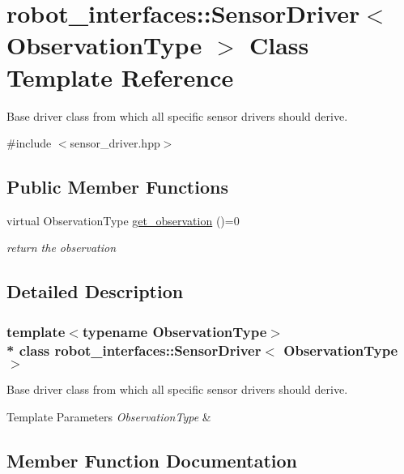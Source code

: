 \hypertarget{classrobot__interfaces_1_1SensorDriver}{}\section{robot\+\_\+interfaces\+:\+:Sensor\+Driver$<$ Observation\+Type $>$ Class Template Reference}
\label{classrobot__interfaces_1_1SensorDriver}


Base driver class from which all specific sensor drivers should derive.  




{\ttfamily \#include $<$sensor\+\_\+driver.\+hpp$>$}

\subsection*{Public Member Functions}
\begin{DoxyCompactItemize}
\item 
virtual Observation\+Type \hyperlink{classrobot__interfaces_1_1SensorDriver_a59a9918c43ba789dffb6e59f9790c6c2}{get\+\_\+observation} ()=0
\begin{DoxyCompactList}\small\item\em return the observation \end{DoxyCompactList}\end{DoxyCompactItemize}


\subsection{Detailed Description}
\subsubsection*{template$<$typename Observation\+Type$>$\\*
class robot\+\_\+interfaces\+::\+Sensor\+Driver$<$ Observation\+Type $>$}

Base driver class from which all specific sensor drivers should derive. 


\begin{DoxyTemplParams}{Template Parameters}
{\em Observation\+Type} & \\
\hline
\end{DoxyTemplParams}


\subsection{Member Function Documentation}

